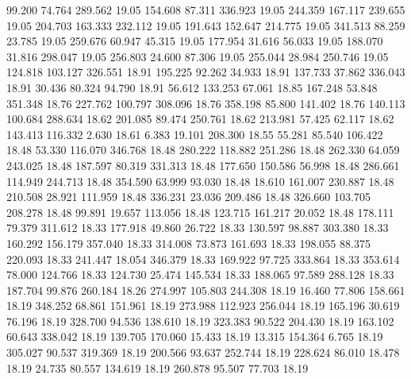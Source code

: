   99.200   74.764  289.562        19.05
 154.608   87.311  336.923        19.05
 244.359  167.117  239.655        19.05
 204.703  163.333  232.112        19.05
 191.643  152.647  214.775        19.05
 341.513   88.259   23.785        19.05
 259.676   60.947   45.315        19.05
 177.954   31.616   56.033        19.05
 188.070   31.816  298.047        19.05
 256.803   24.600   87.306        19.05
 255.044   28.984  250.746        19.05
 124.818  103.127  326.551        18.91
 195.225   92.262   34.933        18.91
 137.733   37.862  336.043        18.91
  30.436   80.324   94.790        18.91
  56.612  133.253   67.061        18.85
 167.248   53.848  351.348        18.76
 227.762  100.797  308.096        18.76
 358.198   85.800  141.402        18.76
 140.113  100.684  288.634        18.62
 201.085   89.474  250.761        18.62
 213.981   57.425   62.117        18.62
 143.413  116.332    2.630        18.61
   6.383   19.101  208.300        18.55
  55.281   85.540  106.422        18.48
  53.330  116.070  346.768        18.48
 280.222  118.882  251.286        18.48
 262.330   64.059  243.025        18.48
 187.597   80.319  331.313        18.48
 177.650  150.586   56.998        18.48
 286.661  114.949  244.713        18.48
 354.590   63.999   93.030        18.48
  18.610  161.007  230.887        18.48
 210.508   28.921  111.959        18.48
 336.231   23.036  209.486        18.48
 326.660  103.705  208.278        18.48
  99.891   19.657  113.056        18.48
 123.715  161.217   20.052        18.48
 178.111   79.379  311.612        18.33
 177.918   49.860   26.722        18.33
 130.597   98.887  303.380        18.33
 160.292  156.179  357.040        18.33
 314.008   73.873  161.693        18.33
 198.055   88.375  220.093        18.33
 241.447   18.054  346.379        18.33
 169.922   97.725  333.864        18.33
 353.614   78.000  124.766        18.33
 124.730   25.474  145.534        18.33
 188.065   97.589  288.128        18.33
 187.704   99.876  260.184        18.26
 274.997  105.803  244.308        18.19
  16.460   77.806  158.661        18.19
 348.252   68.861  151.961        18.19
 273.988  112.923  256.044        18.19
 165.196   30.619   76.196        18.19
 328.700   94.536  138.610        18.19
 323.383   90.522  204.430        18.19
 163.102   60.643  338.042        18.19
 139.705  170.060   15.433        18.19
  13.315  154.364    6.765        18.19
 305.027   90.537  319.369        18.19
 200.566   93.637  252.744        18.19
 228.624   86.010   18.478        18.19
  24.735   80.557  134.619        18.19
 260.878   95.507   77.703        18.19
